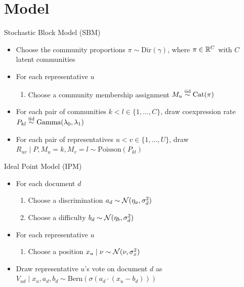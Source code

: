 \documentclass{article}
\begin{document}
\section{Model}
\label{model}


\noindent Stochastic Block Model (SBM)
\begin{itemize}
\item Choose the community proportions $\pi \sim \text{Dir}(\gamma)$, where $\pi\in \mathbb{R}^C$ with $C$ latent communities
\item For each representative $u$
\begin{enumerate}
\item Choose a community membership assignment $M_u\stackrel{\tiny\text{iid}}{\sim} \text{Cat}(\pi)$
\end{enumerate}
\item For each pair of communities $k< l\in\{1,\dots, C\}$, draw coexpression rate $P_{kl} \stackrel{\tiny\text{iid}}{\sim} \text{Gamma}(\lambda_0,\lambda_1)$%
\item For each pair of representatives $u<v\in\{1,\dots, U\}$, draw $R_{uv} \mid P, M_u=k, M_v=l\sim \text{Poisson}(P_{kl})$
\end{itemize}


\noindent Ideal Point Model (IPM)
\begin{itemize}
\item For each document $d$
\begin{enumerate}
\item Choose a discrimination $a_d \sim \mathcal{N}(\eta_{a},\sigma^2_d)$
\item Choose a difficulty $b_d \sim \mathcal{N}(\eta_{b},\sigma^2_d)$
\end{enumerate}
\item For each representative $u$
\begin{enumerate}
\item Choose a position $x_u\mid \nu \sim \mathcal{N}(\nu,\sigma^2_x)$
\end{enumerate}
\item Draw representative $u$'s vote on document $d$ as $V_{ud} \mid x_u, a_d, b_d \sim \text{Bern}(\sigma(a_d\cdot(x_u-b_d)))$%
\end{itemize}
\end{document}
